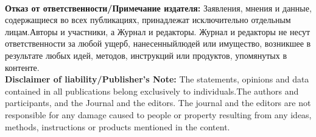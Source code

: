 \documentclass[i-edu.uz,journal,article,submit,pdftex,moreauthors]{Definitions/i-edu.uz}
\begin{document}
\begin{sloppypar}
%


\\
\noindent\textbf{Отказ от ответственности/Примечание издателя:} Заявления, мнения и данные, содержащиеся во всех публикациях, принадлежат исключительно отдельным лицам.Авторы и участники, а Журнал и редакторы. Журнал и редакторы не несут ответственности за любой ущерб, нанесенныйлюдей или имущество, возникшее в результате любых идей, методов, инструкций или продуктов, упомянутых в контенте.\\

\noindent\textbf{Disclaimer of liability/Publisher's Note:} The statements, opinions and data contained in all publications belong exclusively to individuals.The authors and participants, and the Journal and the editors. The journal and the editors are not responsible for any damage caused to people or property resulting from any ideas, methods, instructions or products mentioned in the content.

\end{sloppypar}
\end{document}
